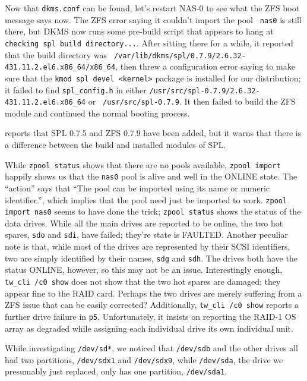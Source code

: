 \documentclass[12pt]{article}
\begin{document}
\qq Now that {\tt dkms.conf} can be found, let's restart NAS-0 to see what the
ZFS boot message says now. The ZFS error saying it couldn't import the pool {\tt
  nas0} is still there, but DKMS now runs some pre-build script that appears to
hang at {\tt checking spl build directory...}. After sitting there for a while,
it reported that the build directory was {\tt
  /var/lib/dkms/spl/0.7.9/2.6.32-431.11.2.el6.x86\_64/x86\_64}, then threw a
configuration error saying to make sure that the {\tt kmod spl devel <kernel>}
package is installed for our distribution; it failed to find {\tt spl\_config.h}
in either {\tt /usr/src/spl-0.7.9/2.6.32-431.11.2.el6.x86\_64} or {\tt
  /usr/src/spl-0.7.9}. It then failed to build the ZFS module and continued the
normal booting process. 

 reports that SPL 0.7.5 and ZFS 0.7.9 have been added, but
it warns that there is a difference between the build and installed modules of
SPL. 

\qq While {\tt zpool status} shows that there are no pools available, {\tt zpool
  import} happily shows us that the {\tt nas0} pool is alive and well in the
ONLINE state. The ``action'' says that ``The pool can be imported using its name
or numeric identifier.'', which implies that the pool need just be imported to
work. {\tt zpool import nas0} seems to have done the trick; {\tt zpool status}
shows the status of the data drives. While all the main drives are reported to
be online, the two hot spares, {\tt sdo} and {\tt sdi}, have failed; they're
state is FAULTED. Another peculiar note is that, while most of the drives are
represented by their SCSI identifiers, two are simply identified by their names,
{\tt sdg} and {\tt sdh}. The drives both have the status ONLINE, however, so
this may not be an issue. Interestingly enough, {\tt tw\_cli /c0 show} does not
show that the two hot spares are damaged; they appear fine to the RAID
card. Perhaps the two drives are merely suffering from a ZFS issue that can be
easily corrected? Additionally, {\tt tw\_cli /c0 show} reports a further drive
failure in {\tt p5}. Unfortunately, it insists on reporting the RAID-1 OS array
as degraded while assigning each individual drive its own individual unit. 

\qq While investigating {\tt /dev/sd*}, we noticed that {\tt /dev/sdb} and the
other drives all had two partitions, {\tt /dev/sdx1} and {\tt /dev/sdx9}, while
{\tt /dev/sda}, the drive we presumably just replaced, only has one partition,
{\tt /dev/sda1}. 
\end{document}

